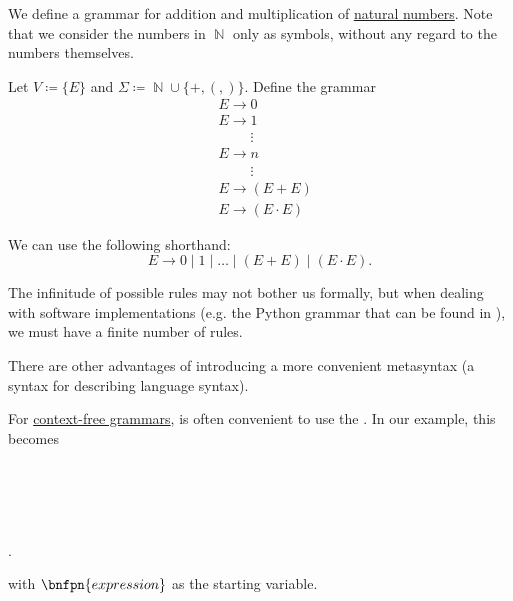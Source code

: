 \begin{example}\label{ex:natural_arithmetic_grammar/backus_naur_form}
  We define a grammar for addition and multiplication of \hyperref[def:set_of_natural_numbers]{natural numbers}. Note that we consider the numbers in \( \BbbN \) only as symbols, without any regard to the numbers themselves.

  Let \( V \coloneqq \{ E \} \) and \( \Sigma \coloneqq \BbbN \cup \{ +, (, ) \} \). Define the grammar
  \begin{equation}\label{eq:ex:natural_arithmetic_grammar/backus_naur_form/simple}
    \begin{aligned}
      &E \to 0 \\
      &E \to 1 \\
      &\phantom{E \to} \vdots \\
      &E \to n \\
      &\phantom{E \to} \vdots \\
      &E \to (E + E) \\
      &E \to (E \cdot E)
    \end{aligned}
  \end{equation}

  We can use the following shorthand:
  \begin{equation}\label{eq:ex:natural_arithmetic_grammar/backus_naur_form/shorthand}
    E \to 0 \mid 1 \mid \ldots \mid (E + E) \mid (E \cdot E).
  \end{equation}

  The infinitude of possible rules may not bother us formally, but when dealing with software implementations (e.g. the Python grammar that can be found in \cite{Python39Grammar}), we must have a finite number of rules.

  There are other advantages of introducing a more convenient metasyntax (a syntax for describing language syntax).

  For \hyperref[def:grammar/context_free]{context-free grammars}, is often convenient to use the . In our example, this becomes
  \begin{bnf*}
     { \bnfor {} \bnfor {} \bnfor {} \bnfor {} \bnfor {} \bnfor {} \bnfor {} \bnfor {}} \\
             { \bnfor {}} \\
            { \bnfor {} \bnfsp {}} \\
         {\bnfts{+} \bnfor \bnfts{\( \cdot \)}} \\
        { \bnfor \bnfts{(} \bnfsp {} \bnfsp {} \bnfsp {} \bnfsp \bnfts{)}}.
  \end{bnf*}
  with \( \bnfpn{expression} \) as the starting variable.


\end{example}
